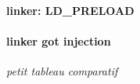\paragraph{linker: LD\_PRELOAD}




\paragraph{linker got injection}

{\color{red} \textit{petit tableau comparatif}}
